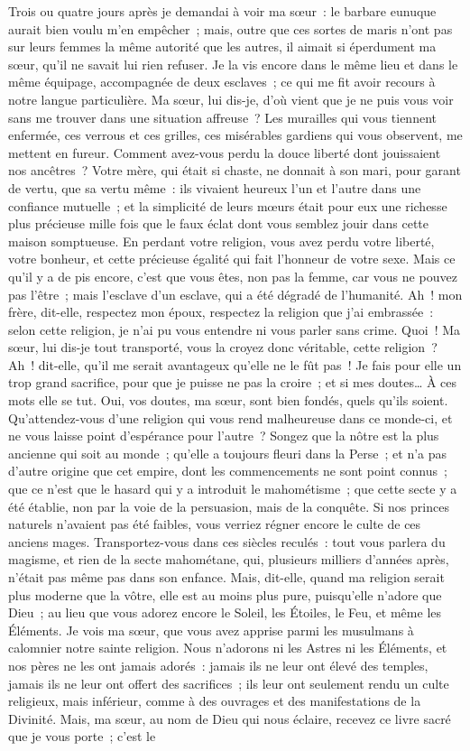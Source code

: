 \documentclass[french,twoside]{book} %
\begin{document}
Trois ou quatre jours après je demandai à voir ma sœur : le barbare eunuque aurait bien voulu m’en empêcher ; mais, outre que ces sortes de maris n’ont pas sur leurs femmes la même autorité que les autres, il aimait si éperdument ma sœur, qu’il ne savait lui rien refuser. Je la vis encore dans le même lieu et dans le même équipage, accompagnée de deux esclaves ; ce qui me fit avoir recours à notre langue particulière. Ma sœur, lui dis-je, d’où vient que je ne puis vous voir sans me trouver dans une situation affreuse ? Les murailles qui vous tiennent enfermée, ces verrous et ces grilles, ces misérables gardiens qui vous observent, me mettent en fureur. Comment avez-vous perdu la douce liberté dont jouissaient nos ancêtres ? Votre mère, qui était si chaste, ne donnait à son mari, pour garant de vertu, que sa vertu même : ils vivaient heureux l’un et l’autre dans une confiance mutuelle ; et la simplicité de leurs mœurs était pour eux une richesse plus précieuse mille fois que le faux éclat dont vous semblez jouir dans cette maison somptueuse. En perdant votre religion, vous avez perdu votre liberté, votre bonheur, et cette précieuse égalité qui fait l’honneur de votre sexe. Mais ce qu’il y a de pis encore, c’est que vous êtes, non pas la femme, car vous ne pouvez pas l’être ; mais l’esclave d’un esclave, qui a été dégradé de l’humanité. Ah ! mon frère, dit-elle, respectez mon époux, respectez la religion que j’ai embrassée : selon cette religion, je n’ai pu vous entendre ni vous parler sans crime. Quoi ! Ma sœur, lui dis-je tout transporté, vous la croyez donc véritable, cette religion ? Ah ! dit-elle, qu’il me serait avantageux qu’elle ne le fût pas ! Je fais pour elle un trop grand sacrifice, pour que je puisse ne pas la croire ; et si mes doutes… À ces mots elle se tut. Oui, vos doutes, ma sœur, sont bien fondés, quels qu’ils soient. Qu’attendez-vous d’une religion qui vous rend malheureuse dans ce monde-ci, et ne vous laisse point d’espérance pour l’autre ? Songez que la nôtre est la plus ancienne qui soit au monde ; qu’elle a toujours fleuri dans la Perse ; et n’a pas d’autre origine que cet empire, dont les commencements ne sont point connus ; que ce n’est que le hasard qui y a introduit le mahométisme ; que cette secte y a été établie, non par la voie de la persuasion, mais de la conquête. Si nos princes naturels n’avaient pas été faibles, vous verriez régner encore le culte de ces anciens mages. Transportez-vous dans ces siècles reculés : tout vous parlera du magisme, et rien de la secte mahométane, qui, plusieurs milliers d’années après, n’était pas même pas dans son enfance. Mais, dit-elle, quand ma religion serait plus moderne que la vôtre, elle est au moins plus pure, puisqu’elle n’adore que Dieu ; au lieu que vous adorez encore le Soleil, les Étoiles, le Feu, et même les Éléments. Je vois ma sœur, que vous avez apprise parmi les musulmans à calomnier notre sainte religion. Nous n’adorons ni les Astres ni les Éléments, et nos pères ne les ont jamais adorés : jamais ils ne leur ont élevé des temples, jamais ils ne leur ont offert des sacrifices ; ils leur ont seulement rendu un culte religieux, mais inférieur, comme à des ouvrages et des manifestations de la Divinité. Mais, ma sœur, au nom de Dieu qui nous éclaire, recevez ce livre sacré que je vous porte ; c’est le 
\end{document}

